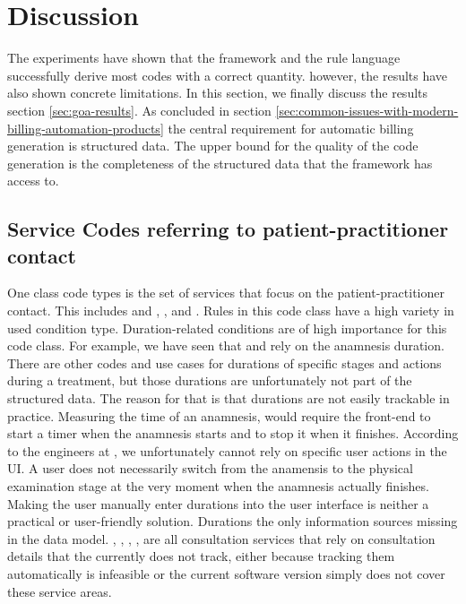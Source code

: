 \section{Discussion}\label{sec:discussion}

The experiments have shown that the framework and the rule language successfully derive most codes with a correct quantity.
however, the results have also shown concrete limitations.
In this section, we finally discuss the results section \ref{sec:goa-results}.
As concluded in section \ref{sec:common-issues-with-modern-billing-automation-products} the central requirement for automatic billing generation is structured data.
The upper bound for the quality of the code generation is the completeness of the structured data that the framework has access to.

\subsection{Service Codes referring to patient-practitioner contact}\label{subsec:service-codes-referring-to-patient-practitioner-contact}
One class code types is the set of services that focus on the patient-practitioner contact.
This includes  and , ,  and .
Rules in this code class have a high variety in used condition type.
Duration-related conditions are of high importance for this code class.
For example, we have seen that  and  rely on the anamnesis duration.
There are other codes and use cases for durations of specific stages and actions during a treatment, but those durations are unfortunately not part of the structured data.
The reason for that is that durations are not easily trackable in practice.
Measuring the time of an anamnesis, would require the front-end to start a timer when the anamnesis starts and to stop it when it finishes.
According to the engineers at \AV, we unfortunately cannot rely on specific user actions in the UI.
A user does not necessarily switch from the anamensis to the physical examination stage at the very moment when the anamnesis actually finishes.
Making the user manually enter durations into the user interface is neither a practical or user-friendly solution.
Durations the only information sources missing in the \AV data model.
, , , ,  are all consultation services that rely on consultation details that the \AV currently does not track,
either because tracking them automatically is infeasible or the current software version simply does not cover these service areas.

